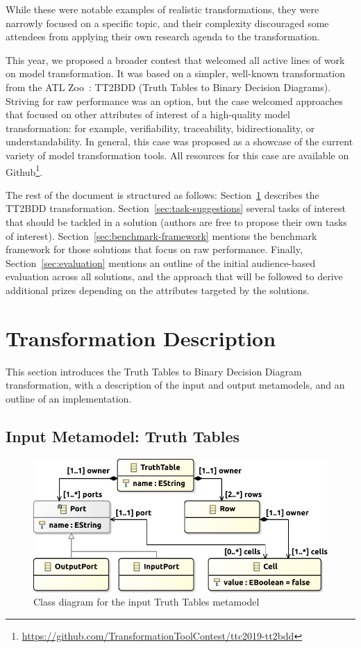 \documentclass[a4paper]{article}
\begin{document}
While these were notable examples of realistic transformations, they were
narrowly focused on a specific topic, and their complexity discouraged some
attendees from applying their own research agenda to the transformation.

This year, we proposed a broader contest that welcomed all active lines of work
on model transformation. It was based on a simpler, well-known transformation
from the ATL Zoo~\cite{atlzoo}: TT2BDD (Truth Tables to Binary Decision
Diagrams). Striving for raw performance was an option, but the case welcomed
approaches that focused on other attributes of interest of a high-quality model
transformation: for example, verifiability, traceability, bidirectionality, or
understandability. In general, this case was proposed as a showcase of the
current variety of model transformation tools. All resources for this case are
available on
Github\footnote{\url{https://github.com/TransformationToolContest/ttc2019-tt2bdd}}.

The rest of the document is structured as follows:
Section~\ref{sec:transf-descr} describes the TT2BDD transformation.
Section~\ref{sec:task-suggestions} several tasks of interest that should be
tackled in a solution (authors are free to propose their own tasks of interest).
Section~\ref{sec:benchmark-framework} mentions the benchmark framework for those
solutions that focus on raw performance. Finally, Section~\ref{sec:evaluation}
mentions an outline of the initial audience-based evaluation across all
solutions, and the approach that will be followed to derive additional prizes
depending on the attributes targeted by the solutions.

\section{Transformation Description}
\label{sec:transf-descr}

This section introduces the Truth Tables to Binary Decision Diagram
transformation, with a description of the input and output metamodels, and an
outline of an implementation.

\subsection{Input Metamodel: Truth Tables}
\label{sec:input-metam-truth}

\begin{figure}
  \centering
  \includegraphics[width=.6\textwidth]{tt-class-diagram-v2}
  \caption{Class diagram for the input Truth Tables metamodel}
  \label{fig:tt-metamodel}
\end{figure}
\end{document}
